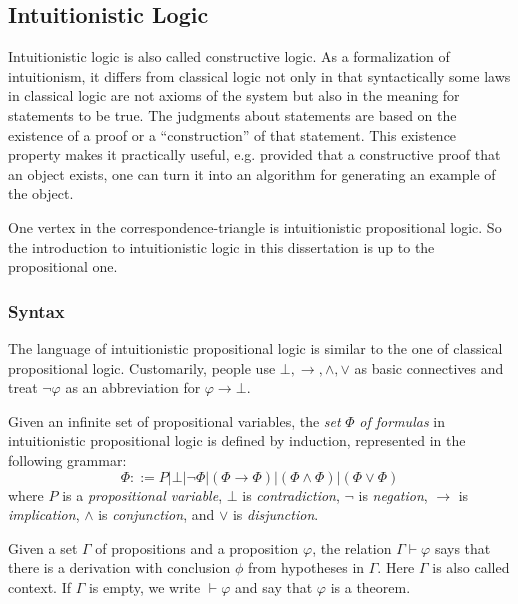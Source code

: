 \subsection{Intuitionistic Logic}
\label{sec:bg_il}
Intuitionistic logic is also called constructive logic. As a formalization of intuitionism, it differs from classical logic not only in that syntactically some laws in classical logic are not axioms of the system but also in the meaning for statements to be true. The judgments about statements are based on the existence of a proof or a ``construction'' of that statement. This existence property makes it practically useful, e.g. provided that a constructive proof that an object exists, one can turn it into an algorithm for generating an example of the object.

One vertex in the correspondence-triangle is intuitionistic propositional logic. So the introduction to intuitionistic logic in this dissertation is up to the propositional one.

\subsubsection{Syntax}
\label{sec:bg_il_s}
The language of intuitionistic propositional logic is similar to the one of classical propositional logic. Customarily, people use $ \bot , \to , \land , \lor $ as basic connectives and treat $ \neg \varphi $ as an abbreviation for $ \varphi \to \bot $.

\begin{definition}
\label{definition:formulas}
Given an infinite set of propositional variables, the \emph{set} $ \Phi $ \emph{of formulas} in intuitionistic propositional logic is defined by induction, represented in the following grammar:
\[
\Phi ::= P | \bot | \neg \Phi | ( \Phi \to \Phi ) | ( \Phi \land \Phi ) | ( \Phi \lor \Phi )
\]
where $ P $ is a \emph{propositional variable}, $ \bot $ is \emph{contradiction}, $ \neg $ is \emph{negation}, $ \to $ is \emph{implication}, $ \land $ is \emph{conjunction}, and $ \lor $ is \emph{disjunction}.
\end{definition}

Given a set $ \Gamma $ of propositions and a proposition $ \varphi $, the relation $ \Gamma \vdash \varphi $ says that there is a derivation with conclusion $ \phi $ from hypotheses in $ \Gamma $. Here $ \Gamma $ is also called context. If $ \Gamma $ is empty, we write $ \vdash \varphi $ and say that $ \varphi $ is a theorem.

